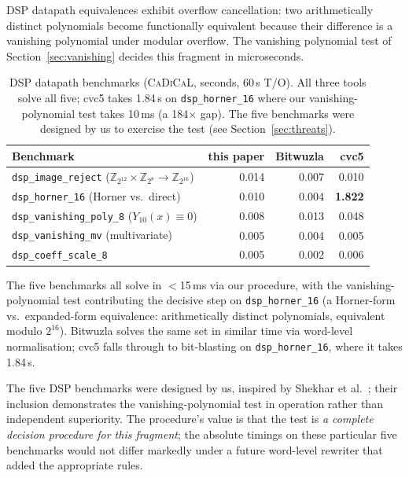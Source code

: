 \documentclass[runningheads]{llncs}
\newcommand{\cadical}{\textsc{CaDiCaL}\xspace}
\begin{document}
DSP datapath equivalences exhibit overflow cancellation:
two arithmetically distinct polynomials become functionally
equivalent because their difference is a vanishing polynomial
under modular overflow. The vanishing polynomial test of
Section~\ref{sec:vanishing} decides this fragment in
microseconds.

\begin{table}[ht]
\caption{DSP datapath benchmarks (\cadical, seconds, 60\,s
T/O). All three tools solve all five; cvc5 takes 1.84\,s on
\texttt{dsp\_horner\_16} where our vanishing-polynomial test
takes 10\,ms (a 184$\times$ gap). The five benchmarks were
designed by us to exercise the test (see
Section~\ref{sec:threats}).}
\label{tab:dsp}
\centering
\begin{tabular}{lrrr}
\toprule
Benchmark & this paper & Bitwuzla & cvc5 \\
\midrule
\texttt{dsp\_image\_reject} ($\mathbb{Z}_{2^{12}} \times \mathbb{Z}_{2^8} \to \mathbb{Z}_{2^{16}}$) & 0.014 & 0.007 & 0.010 \\
\texttt{dsp\_horner\_16} (Horner vs.\ direct) & 0.010 & 0.004 & \textbf{1.822} \\
\texttt{dsp\_vanishing\_poly\_8} ($Y_{10}(x) \equiv 0$)       & 0.008 & 0.013 & 0.048 \\
\texttt{dsp\_vanishing\_mv} (multivariate)                    & 0.005 & 0.004 & 0.005 \\
\texttt{dsp\_coeff\_scale\_8}                                  & 0.005 & 0.002 & 0.006 \\
\bottomrule
\end{tabular}
\end{table}

The five benchmarks all solve in $<$15\,ms via our procedure,
with the vanishing-polynomial test contributing the decisive
step on \texttt{dsp\_horner\_16} (a Horner-form vs.\ expanded-form
equivalence: arithmetically distinct polynomials, equivalent
modulo $2^{16}$). Bitwuzla solves the same set in similar time
via word-level normalisation; cvc5 falls through to bit-blasting
on \texttt{dsp\_horner\_16}, where it takes 1.84\,s.

The five DSP benchmarks were designed by us, inspired by
Shekhar et al.~\cite{shekhar2007equivalence}; their inclusion
demonstrates the vanishing-polynomial test in operation rather
than independent superiority. The procedure's value is that the
test is \emph{a complete decision procedure for this fragment};
the absolute timings on these particular five benchmarks would
not differ markedly under a future word-level rewriter that
added the appropriate rules.
\end{document}
